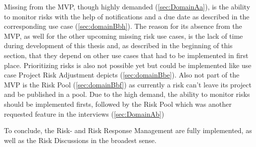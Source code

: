  Missing from the MVP, though highly demanded (\ref{sec:DomainAa}), is the ability to monitor risks with the help of notifications and a due date as described in the corresponding use case (\ref{sec:domainBbh}). The reason for its absence from the MVP, as well for the other upcoming missing risk use cases, is the lack of time during development of this thesis and, as described in the beginning of this section, that they depend on other use cases that had to be implemented in first place. Prioritizing risks is also not possible yet but could be implemented like use case Project Risk Adjustment depicts (\ref{sec:domainBbe}). Also not part of the MVP is the Risk Pool (\ref{sec:domainBbf}) as currently a risk can’t leave its project and be published in a pool. Due to the high demand, the ability to monitor risks should be implemented firsts, followed by the Risk Pool which was another requested feature in the interviews (\ref{sec:DomainAb})
 
 To conclude, the Risk- and Risk Response Management are fully implemented, as well as the Risk Discussions in the broadest sense.